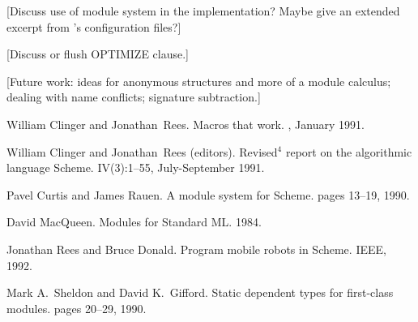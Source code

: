 [Discuss use of module system in the \hack{} implementation?  Maybe
give an extended excerpt from \hack{}'s configuration files?]

[Discuss or flush OPTIMIZE clause.]

[Future work: ideas for anonymous structures and more of a module
calculus; dealing with name conflicts; signature subtraction.]


\begin{thebibliography}{10}

William Clinger and Jonathan~Rees.
\newblock Macros that work.
, January 1991.

William Clinger and Jonathan~Rees (editors).
\newblock Revised${}^4$ report on the algorithmic language {S}cheme.
 IV(3):1--55, July-September 1991.

Pavel Curtis and James Rauen.
\newblock A module system for Scheme.
pages 13--19, 1990.

David MacQueen.
\newblock Modules for Standard ML.
1984.

Jonathan Rees and Bruce Donald.
\newblock Program mobile robots in Scheme.
 IEEE, 1992. 

Mark A.~Sheldon and David K.~Gifford.
\newblock Static dependent types for first-class modules.
pages 20--29, 1990.

\end{thebibliography}




